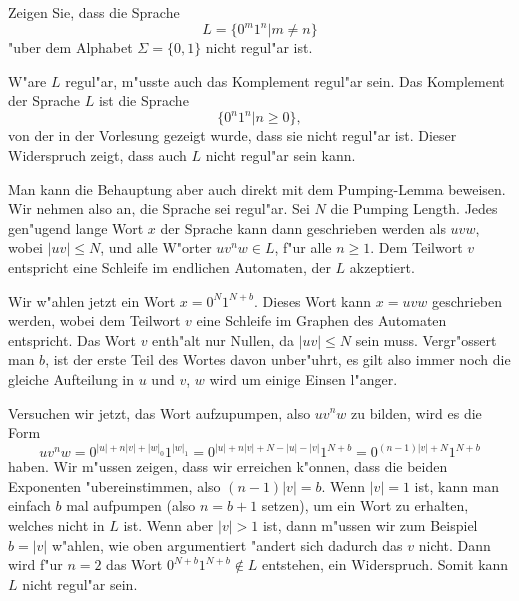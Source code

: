Zeigen Sie, dass die Sprache
\[
L=\{
0^m1^n|m\ne n
\}
\]
"uber dem Alphabet $\Sigma=\{0,1\}$ nicht regul"ar ist.

\begin{loesung}
W"are $L$ regul"ar, m"usste auch das Komplement regul"ar sein.
Das Komplement der Sprache $L$ ist die Sprache
$$\{0^n1^n|n\ge 0\},$$
von der in der Vorlesung gezeigt wurde, dass sie nicht regul"ar
ist. Dieser Widerspruch zeigt, dass auch $L$ nicht regul"ar sein kann.

Man kann die Behauptung aber auch direkt mit dem Pumping-Lemma beweisen.
Wir nehmen also an, die Sprache sei regul"ar. Sei $N$ die Pumping Length.
Jedes gen"ugend lange Wort $x$ der Sprache kann dann geschrieben werden als $uvw$,
wobei $|uv|\le N$, und alle W"orter $uv^nw\in L$, f"ur alle $n\ge 1$.
Dem Teilwort $v$ entspricht eine Schleife im endlichen Automaten, der
$L$ akzeptiert.

Wir w"ahlen jetzt ein Wort $x=0^N1^{N+b}$. Dieses Wort kann
$x=uvw$ geschrieben werden, wobei dem Teilwort $v$ eine Schleife im
Graphen des Automaten entspricht.
Das Wort $v$ enth"alt nur Nullen, da $|uv|\le N$ sein muss. Vergr"ossert
man $b$, ist der erste Teil des Wortes davon unber"uhrt, es gilt also immer
noch die gleiche Aufteilung in $u$ und $v$, $w$ wird um einige Einsen l"anger.

Versuchen wir jetzt, das Wort aufzupumpen, also $uv^nw$ zu bilden, wird es
die Form
$$uv^nw=0^{|u|+n|v|+|w|_0}1^{|w|_1}
=
0^{|u|+n|v|+N-|u|-|v|}1^{N+b}
=
0^{(n-1)|v|+N}1^{N+b}
$$
haben. Wir m"ussen zeigen, dass wir erreichen k"onnen, dass die beiden
Exponenten "ubereinstimmen, also $(n-1)|v|=b$. Wenn $|v|=1$ ist, kann man
einfach $b$ mal aufpumpen (also $n=b+1$ setzen), um ein Wort zu erhalten,
welches nicht in $L$ ist.
Wenn aber $|v|>1$ ist, dann m"ussen wir zum Beispiel $b=|v|$ w"ahlen,
wie oben argumentiert "andert sich dadurch das $v$ nicht. Dann wird f"ur
$n=2$ das Wort $0^{N+b}1^{N+b}\not\in L$ entstehen, ein Widerspruch. Somit
kann $L$ nicht regul"ar sein.
\end{loesung}
